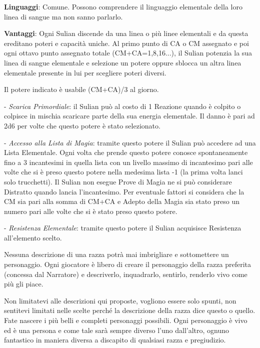 \begin{multicols}{2}
\textbf{Linguaggi}: Comune. Possono comprendere il linguaggio elementale della loro linea di sangue ma non sanno parlarlo.

\textbf{Vantaggi}: Ogni Sulian discende da una linea o più linee elementali e da questa ereditano poteri e capacità uniche. Al primo punto di CA o CM assegnato e poi ogni ottavo punto assegnato totale (CM+CA=1,8,16...), il Sulian potenzia la sua linea di sangue elementale e selezione un potere oppure sblocca un altra linea elementale presente in lui per scegliere poteri diversi.

Il potere indicato è usabile (CM+CA)/3 al giorno.

- \emph{Scarica Primordiale}: il Sulian può al costo di 1 Reazione quando è colpito o colpisce in mischia scaricare parte della sua energia elementale. Il danno è pari ad 2d6 per volte che questo potere è stato selezionato.

- \emph{Accesso alla Lista di Magia}: tramite questo potere il Sulian può accedere ad una Lista Elementale. Ogni volta che prende questo potere conosce spontaneamente fino a 3 incantesimi in quella lista con un livello massimo di incantesimo pari alle volte che si è preso questo potere nella medesima lista -1 (la prima volta lanci solo trucchetti).
Il Sulian non esegue Prove di Magia ne si può considerare Distratto quando lancia l'incantesimo. Per eventuale fattori si considera che la CM sia pari alla somma di CM+CA e Adepto della Magia sia stato preso un numero pari alle volte che si è stato preso questo potere.

- \emph{Resistenza Elementale}: tramite questo potere il Sulian acquisisce Resistenza all'elemento scelto.


\end{multicols}


\begin{changemargin}{0.3cm}{0.3cm}\begin{tcolorbox}[title = Nota sulle Razze]
Nessuna descrizione di una razza potrà mai imbrigliare e sottomettere un personaggio. Ogni giocatore è libero di creare il personaggio della razza preferita (concessa dal Narratore) e descriverlo, inquadrarlo, sentirlo, renderlo vivo come più gli piace.

Non limitatevi alle descrizioni qui proposte, vogliono essere solo spunti, non sentitevi limitati nelle scelte perché la descrizione della razza dice questo o quello.
Fate nascere i più belli e completi personaggi possibili. Ogni personaggio è vivo ed è una persona e come tale sarà sempre diverso l'uno dall'altro, ognuno fantastico in maniera diversa a discapito di qualsiasi razza e pregiudizio.
\end{tcolorbox}\end{changemargin}

